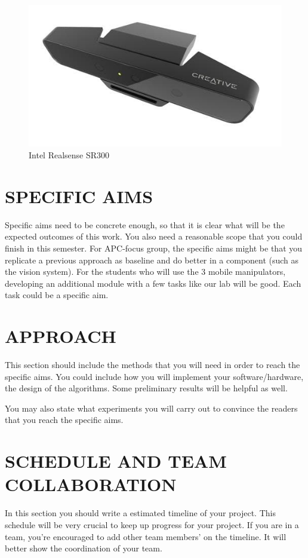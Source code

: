\documentclass[letterpaper, 10 pt, conference]{ieeeconf}  %
\begin{document}
\begin{figure}[h]
\includegraphics[width=0.7\columnwidth]{RealSense_Camera_SR300_SPL}
\centering
\caption{Intel Realsense SR300}
 \label{figure:sr300}
\end{figure}


\section{SPECIFIC AIMS}

Specific aims need to be concrete enough, so that it is clear what will be the expected outcomes of this work. You also need a reasonable scope that you could finish in this semester. For APC-focus group, the specific aims might be that you replicate a previous approach as baseline and do better in a component (such as the vision system). For the students who will use the 3 mobile manipulators, developing an additional module with a few tasks like our lab will be good. Each task could be a specific aim.

\section{APPROACH}

This section should include the methods that you will need in order to reach the specific aims. You could include how you will implement your software/hardware, the design of the algorithms. Some preliminary results will be helpful as well. 

You may also state what experiments you will carry out to convince the readers that you reach the specific aims.

\section{SCHEDULE AND TEAM COLLABORATION}

In this section you should write a estimated timeline of your project. This schedule will be very crucial to keep up progress for your project. If you are in a team, you're encouraged to add other team members' on the timeline. It will better show the coordination of your team.
   



\end{document}
